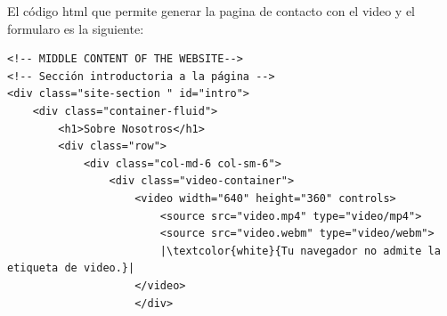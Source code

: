 \documentclass{article}
\begin{document}
\noindent El código html que permite generar la pagina de contacto con el video y el formularo es la siguiente:
\begin{verbatim}
<!-- MIDDLE CONTENT OF THE WEBSITE-->
<!-- Sección introductoria a la página -->
<div class="site-section " id="intro">
    <div class="container-fluid">
        <h1>Sobre Nosotros</h1>
        <div class="row">
            <div class="col-md-6 col-sm-6">
                <div class="video-container">
                    <video width="640" height="360" controls>
                        <source src="video.mp4" type="video/mp4">
                        <source src="video.webm" type="video/webm">
                        |\textcolor{white}{Tu navegador no admite la etiqueta de video.}|
                    </video>
                    </div>
                    

\end{verbatim}
\end{document}
